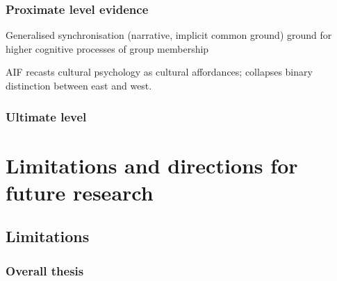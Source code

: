 \subsubsection{Proximate level evidence}



Generalised synchronisation (narrative, implicit common ground)
ground for higher cognitive processes of group membership

AIF recasts cultural psychology as cultural affordances; collapses binary distinction between east and west.




\subsubsection{Ultimate level}










\section{Limitations and directions for future research}

\subsection{Limitations}

\subsubsection{Overall thesis}

